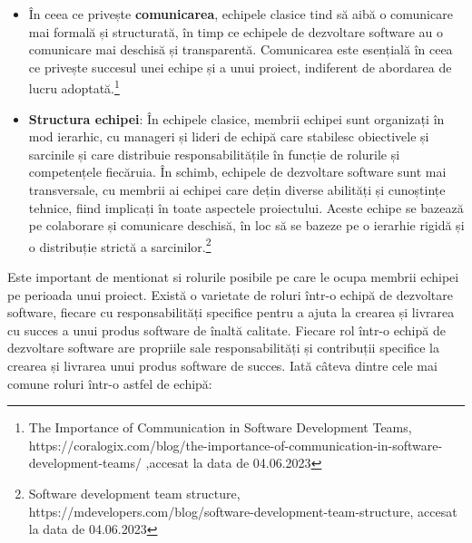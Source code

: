 \documentclass[a4paper, 12pt]{article}
\begin{document}
\begin {itemize}
	\item În ceea ce privește \textbf{comunicarea}, echipele clasice tind să aibă o comunicare mai formală și structurată, în timp ce echipele de dezvoltare software au o comunicare mai deschisă și transparentă. Comunicarea este esențială în ceea ce privește succesul unei echipe și a unui proiect, indiferent de abordarea de lucru adoptată.\footnote{The Importance of Communication in Software Development Teams, https://coralogix.com/blog/the-importance-of-communication-in-software-development-teams/ ,accesat la data de 04.06.2023}
	
	\item \textbf{Structura echipei}: În echipele clasice, membrii echipei sunt organizați în mod ierarhic, cu manageri și lideri de echipă care stabilesc obiectivele și sarcinile și care distribuie responsabilitățile în funcție de rolurile și competențele fiecăruia. În schimb, echipele de dezvoltare software sunt mai transversale, cu membrii ai echipei care dețin diverse abilități și cunoștințe tehnice, fiind implicați în toate aspectele proiectului. Aceste echipe se bazează pe colaborare și comunicare deschisă, în loc să se bazeze pe o ierarhie rigidă și o distribuție strictă a sarcinilor.\footnote{Software development team structure, https://mdevelopers.com/blog/software-development-team-structure, accesat la data de 04.06.2023}


	\end{itemize}
	

	\quad Este important de mentionat si rolurile posibile pe care le ocupa membrii echipei pe perioada unui proiect. Există o varietate de roluri într-o echipă de dezvoltare software, fiecare cu responsabilități specifice pentru a ajuta la crearea și livrarea cu succes a unui produs software de înaltă calitate. Fiecare rol într-o echipă de dezvoltare software are propriile sale responsabilități și contribuții specifice la crearea și livrarea unui produs software de succes.  Iată câteva dintre cele mai comune roluri într-o astfel de echipă:
\end{document}
